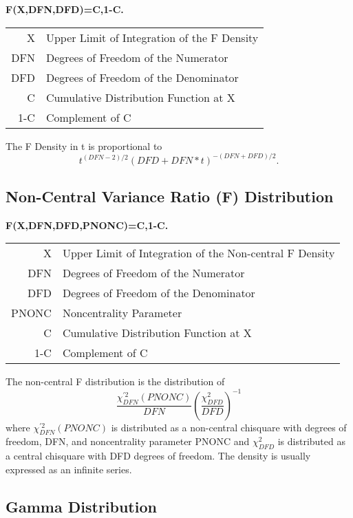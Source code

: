 \documentclass[12pt,dvips]{article}
\newcommand{\mysubsection}[1]
    {\color{green}\subsection{#1}\color{black}}
\begin{document}
{\bf \centering F(X,DFN,DFD)=C,1-C.\\}

\begin{center}
\begin{tabular}{rl}
         X   & Upper Limit of Integration of the F Density\\
         DFN & Degrees of Freedom of the Numerator\\
         DFD & Degrees of Freedom of the Denominator\\
         C   & Cumulative Distribution Function at X\\
         1-C & Complement of C\\
\end{tabular}
\end{center}
     
     The F Density in t is proportional to
\[ t^{(DFN-2)/2} (DFD+DFN*t)^{-(DFN+DFD)/2}. \]
     
     
\mysubsection{Non-Central Variance Ratio (F) Distribution}


{\bf \centering F(X,DFN,DFD,PNONC)=C,1-C.\\}

\begin{center}
\begin{tabular}{rl}
          X     & Upper Limit of Integration of the Non-central F Density\\
          DFN   & Degrees of Freedom of the Numerator\\
          DFD   & Degrees of Freedom of the Denominator\\
          PNONC & Noncentrality Parameter\\
          C     & Cumulative Distribution Function at X\\
          1-C   & Complement of C\\
\end{tabular}
\end{center}

The   non-central  F   distribution   is   the   distribution of    \[
\frac{\chi^{'2}_{DFN}(PNONC)}{DFN} (\frac{\chi^{2}_{DFD}}{DFD})^{-1} \] where
$\chi^{'2}_{DFN}(PNONC)$   is distributed as  a  non-central chisquare
with degrees of freedom, DFN,  and noncentrality parameter PNONC and $
\chi^{2}_{DFD} $ is distributed as a  central chisquare with DFD degrees
of freedom.  The density is usually expressed as an infinite series.

\mysubsection{Gamma Distribution}
     
\end{document}
